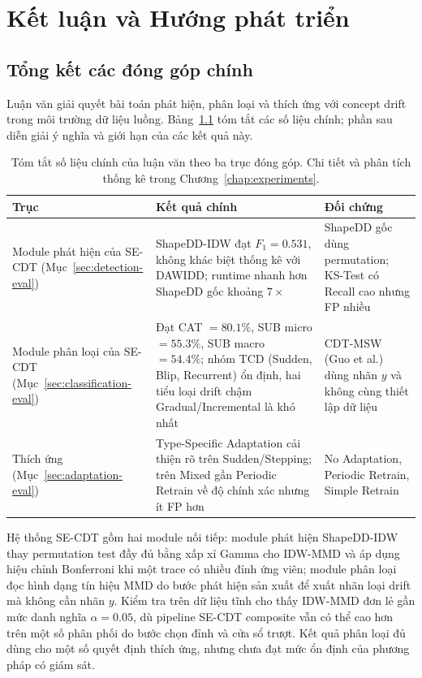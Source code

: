 \chapter{Kết luận và Hướng phát triển}
\label{chap:conclusion}

\section{Tổng kết các đóng góp chính}

Luận văn giải quyết bài toán phát hiện, phân loại và thích ứng với concept drift trong môi trường dữ liệu luồng. Bảng~\ref{tab:contribution-summary} tóm tắt các số liệu chính; phần sau diễn giải ý nghĩa và giới hạn của các kết quả này.

\begin{table}[H]
	\centering
	\caption{Tóm tắt số liệu chính của luận văn theo ba trục đóng góp. Chi tiết và phân tích thống kê trong Chương~\ref{chap:experiments}.}
	\label{tab:contribution-summary}
	\small
	\begin{tabular}{p{}p{}p{}}
		\toprule
		Trục & Kết quả chính & Đối chứng \\
		\midrule
		Module phát hiện của SE-CDT (Mục~\ref{sec:detection-eval}) & ShapeDD-IDW đạt $F_1 = 0.531$, không khác biệt thống kê với DAWIDD; runtime nhanh hơn ShapeDD gốc khoảng $7\times$ & ShapeDD gốc dùng permutation; KS-Test có Recall cao nhưng FP nhiều \\
		Module phân loại của SE-CDT (Mục~\ref{sec:classification-eval}) & Đạt CAT $=80.1\%$, SUB micro $=55.3\%$, SUB macro $=54.4\%$; nhóm TCD (Sudden, Blip, Recurrent) ổn định, hai tiểu loại drift chậm Gradual/Incremental là khó nhất & CDT-MSW (Guo et al.) dùng nhãn $y$ và không cùng thiết lập dữ liệu \\
		Thích ứng (Mục~\ref{sec:adaptation-eval}) & Type-Specific Adaptation cải thiện rõ trên Sudden/Stepping; trên Mixed gần Periodic Retrain về độ chính xác nhưng ít FP hơn & No Adaptation, Periodic Retrain, Simple Retrain \\
		\bottomrule
	\end{tabular}
\end{table}

Hệ thống SE-CDT gồm hai module nối tiếp: module phát hiện ShapeDD-IDW thay permutation test đầy đủ bằng xấp xỉ Gamma cho IDW-MMD và áp dụng hiệu chỉnh Bonferroni khi một trace có nhiều đỉnh ứng viên; module phân loại đọc hình dạng tín hiệu MMD do bước phát hiện sản xuất để xuất nhãn loại drift mà không cần nhãn $y$. Kiểm tra trên dữ liệu tĩnh cho thấy IDW-MMD đơn lẻ gần mức danh nghĩa $\alpha = 0.05$, dù pipeline SE-CDT composite vẫn có thể cao hơn trên một số phân phối do bước chọn đỉnh và cửa sổ trượt. Kết quả phân loại đủ dùng cho một số quyết định thích ứng, nhưng chưa đạt mức ổn định của phương pháp có giám sát.


